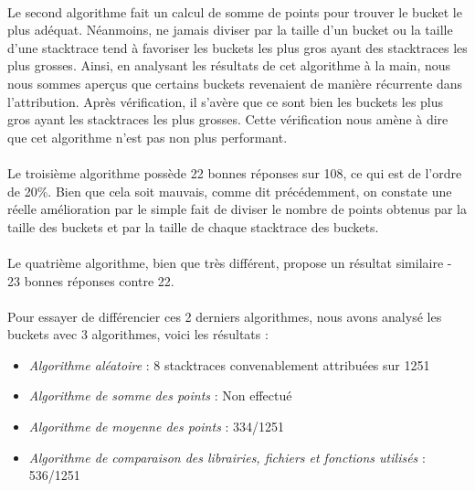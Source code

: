 \documentclass{article}
\begin{document}
\paragraph{}
Le second algorithme fait un calcul de somme de points pour trouver le bucket le plus adéquat. Néanmoins, ne jamais diviser par la taille d'un bucket ou la taille d'une stacktrace tend à favoriser les buckets les plus gros ayant des stacktraces les plus grosses. Ainsi, en analysant les résultats de cet algorithme à la main, nous nous sommes aperçus que certains buckets revenaient de manière récurrente dans l'attribution. Après vérification, il s'avère que ce sont bien les buckets les plus gros ayant les stacktraces les plus grosses. Cette vérification nous amène à dire que cet algorithme n'est pas non plus performant.

\paragraph{}
Le troisième algorithme possède 22 bonnes réponses sur 108, ce qui est de l'ordre de 20\%. Bien que cela soit mauvais, comme dit précédemment, on constate une réelle amélioration par le simple fait de diviser le nombre de points obtenus par la taille des buckets et par la taille de chaque stacktrace des buckets.

\paragraph{}
Le quatrième algorithme, bien que très différent, propose un résultat similaire - 23 bonnes réponses contre 22.

\paragraph{}
Pour essayer de différencier ces 2 derniers algorithmes, nous avons analysé les buckets avec 3 algorithmes, voici les résultats : 

\begin{itemize}
\item \textit{Algorithme aléatoire} : 8 stacktraces convenablement attribuées sur 1251
\item \textit{Algorithme de somme des points} : Non effectué
\item \textit{Algorithme de moyenne des points} : 334/1251
\item \textit{Algorithme de comparaison des librairies, fichiers et fonctions utilisés} : 536/1251
\end{itemize}
\end{document}

